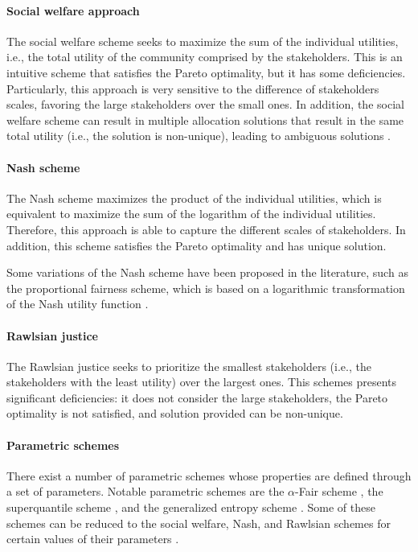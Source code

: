 \begin{refsection}[referencesCh1]
\paragraph{Social welfare approach}
The social welfare scheme seeks to maximize the sum of the individual utilities, i.e., the total utility of the community comprised by the stakeholders. This is an intuitive scheme that satisfies the Pareto optimality, but it has some deficiencies. Particularly, this approach is very sensitive to the difference of stakeholders scales, favoring the large stakeholders over the small ones. In addition, the social welfare scheme can result in multiple allocation solutions that result in the same total utility (i.e., the solution is non-unique), leading to ambiguous solutions \citep{sampat2019fairness}.

\paragraph{Nash scheme}
The Nash scheme \citep{Nash1950, roth1979impossibility} maximizes the product of the individual utilities, which is equivalent to maximize the sum of the logarithm of the individual utilities. Therefore, this approach is able to capture the different scales of stakeholders. In addition, this scheme satisfies the Pareto optimality and has unique solution. 

Some variations of the Nash scheme have been proposed in the literature, such as the proportional fairness scheme, which is based on a logarithmic transformation of the Nash utility function \citep{bertsimas2011price}.


\paragraph{Rawlsian justice}
The Rawlsian justice \citep{Rawls2020} seeks to prioritize the smallest stakeholders (i.e., the stakeholders with the least utility) over the largest ones. This schemes presents significant deficiencies: it does not consider the large stakeholders, the Pareto optimality is not satisfied, and solution provided can be non-unique.

\paragraph{Parametric schemes}
There exist a number of parametric schemes whose properties are defined through a set of parameters. Notable parametric schemes are the $\alpha$-Fair scheme \citep{lan2010axiomatic}, the superquantile scheme \citep{dowling2016framework}, and the generalized entropy scheme \citep{cowell1981additivity}. Some of these schemes can be reduced to the social welfare, Nash, and Rawlsian schemes for certain values of their parameters \citep{sampat2019fairness}.



\end{refsection}
